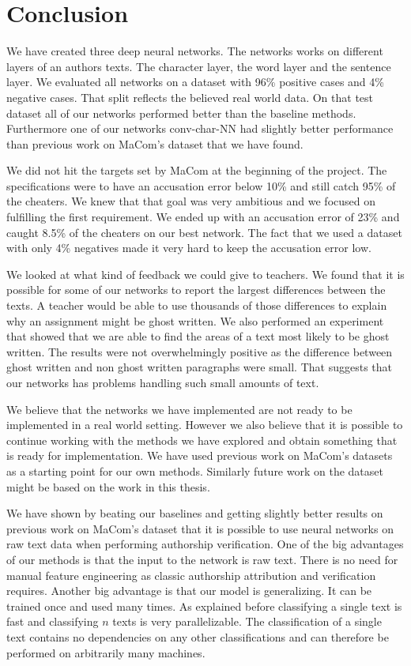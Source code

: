 \section{Conclusion} \label{sec:conclusion}

We have created three deep neural networks. The networks works on different
layers of an authors texts. The character layer, the word layer and the sentence
layer. We evaluated all networks on a dataset with 96\% positive cases and
4\% negative cases. That split reflects the believed real world data. On
that test dataset all of our networks performed better than the baseline
methods. Furthermore one of our networks \gls{conv-char-NN} had slightly better
performance than previous work on MaCom's dataset that we have found.

We did not hit the targets set by MaCom at the beginning of the project. The
specifications were to have an accusation error below 10\% and still catch 95\%
of the cheaters. We knew that that goal was very ambitious and we focused on
fulfilling the first requirement. We ended up with an accusation error of 23\%
and caught 8.5\% of the cheaters on our best network. The fact that we used a
dataset with only 4\% negatives made it very hard to keep the accusation error
low.

We looked at what kind of feedback we could give to teachers. We found that it
is possible for some of our networks to report the largest differences between
the texts. A teacher would be able to use thousands of those differences
to explain why an assignment might be ghost written. We also performed an
experiment that showed that we are able to find the areas of a text most likely
to be ghost written. The results were not overwhelmingly positive as the
difference between ghost written and non ghost written paragraphs were small.
That suggests that our networks has problems handling such small amounts of
text.

We believe that the networks we have implemented are not ready to be implemented
in a real world setting. However we also believe that it is possible to continue
working with the methods we have explored and obtain something that is ready for
implementation. We have used previous work on MaCom's datasets as a starting
point for our own methods. Similarly future work on the dataset might be based
on the work in this thesis.

We have shown by beating our baselines and getting slightly better results on
previous work on MaCom's dataset that it is possible to use neural networks
on raw text data when performing authorship verification. One of the big
advantages of our methods is that the input to the network is raw text. There
is no need for manual feature engineering as classic authorship attribution and
verification requires. Another big advantage is that our model is generalizing.
It can be trained once and used many times. As explained before classifying
a single text is fast and classifying $n$ texts is very parallelizable.
The classification of a single text contains no dependencies on any other
classifications and can therefore be performed on arbitrarily many machines.
